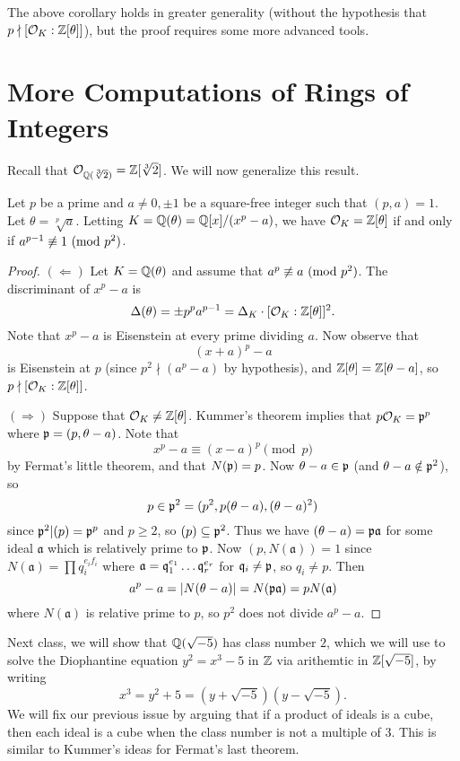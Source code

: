 \begin{remark}
  The above corollary holds in greater generality
  (without the hypothesis that $p \nmid [\mathcal{O}_K : \mathbb{Z}[\theta]]$),
  but the proof requires some more advanced tools.
\end{remark}

\section{More Computations of Rings of Integers}

\begin{remark}
  Recall that $\mathcal{O}_{\mathbb{Q}(\sqrt[3]{2})} = \mathbb{Z}[\sqrt[3]{2}]$.
  We will now generalize this result.
\end{remark}

\begin{theorem}
  Let $p$ be a prime and $a \ne 0, \pm 1$ be a
  square-free integer such that $(p, a) = 1$.
  Let $\theta = \sqrt[p]{a}$. Letting
  $K = \mathbb{Q}(\theta) = \mathbb{Q}[x] / (x^p - a)$, we have
  $\mathcal{O}_K = \mathbb{Z}[\theta]$
  if and only if $a^{p - 1} \not\equiv 1 \ (\mathrm{mod}\ p^2)$.
\end{theorem}

\begin{proof}
  $(\Leftarrow)$
  Let $K = \mathbb{Q}(\theta)$ and assume that
  $a^p \not\equiv a \ (\mathrm{mod}\ p^2)$. The discriminant
  of $x^p - a$ is
  \[
    \Delta(\theta) = \pm p^p a^{p - 1}
    = \Delta_K \cdot [\mathcal{O}_K : \mathbb{Z}[\theta]]^2.
  \]
  Note that $x^p - a$ is Eisenstein at every prime
  dividing $a$. Now observe that
  \[
    (x + a)^p - a
  \]
  is Eisenstein at $p$ (since $p^2 \nmid (a^p - a)$
  by hypothesis), and $\mathbb{Z}[\theta] = \mathbb{Z}[\theta - a]$,
  so $p \nmid [\mathcal{O}_K : \mathbb{Z}[\theta]]$.

  $(\Rightarrow)$ Suppose that $\mathcal{O}_K \ne \mathbb{Z}[\theta]$.
  Kummer's theorem implies that $p \mathcal{O}_K = \mathfrak{p}^p$ where
  $\mathfrak{p} = (p, \theta - a)$. Note that
  \[
    x^p - a \equiv (x - a)^p \pmod{p}
  \]
  by Fermat's little theorem, and that $N(\mathfrak{p}) = p$.
  Now $\theta - a \in \mathfrak{p}$ (and $\theta - a \notin \mathfrak{p}^2$), so
  \[
    p \in \mathfrak{p}^2 = (p^2, p(\theta - a), (\theta - a)^2)
  \]
  since $\mathfrak{p}^2 | (p) = \mathfrak{p}^p$ and $p \ge 2$, so
  $(p) \subseteq \mathfrak{p}^2$. Thus we have
  $(\theta - a) = \mathfrak{p} \mathfrak{a}$
  for some ideal $\mathfrak{a}$ which is relatively
  prime to $\mathfrak{p}$. Now
  $(p, N(\mathfrak{a})) = 1$ since
  $N(\mathfrak{a}) = \prod q_i^{e_i f_i}$ where
  $\mathfrak{a} = \mathfrak{q}_1^{e_1} \dots \mathfrak{q}_r^{e_r}$ for
  $\mathfrak{q}_i \ne \mathfrak{p}$, so $q_i \ne p$. Then
  \[
    a^p - a = |N(\theta - a)| = N(\mathfrak{p} \mathfrak{a})
    = p N(\mathfrak{a})
  \]
  where $N(\mathfrak{a})$ is relative prime to $p$,
  so $p^2$ does not divide $a^p - a$.
\end{proof}

\begin{remark}
  Next class, we will show that $\mathbb{Q}(\sqrt{-5})$
  has class number $2$, which we will use to solve
  the Diophantine equation $y^2 = x^3 - 5$ in $\mathbb{Z}$
  via arithemtic in $\mathbb{Z}[\sqrt{-5}]$, by writing
  \[
    x^3 = y^2 + 5 = (y + \sqrt{-5})(y - \sqrt{-5}).
  \]
  We will fix our previous issue by arguing
  that if a product of ideals is
  a cube, then each ideal is a cube when the class
  number is not a multiple of $3$. This is
  similar to Kummer's ideas for Fermat's last theorem.
\end{remark}
